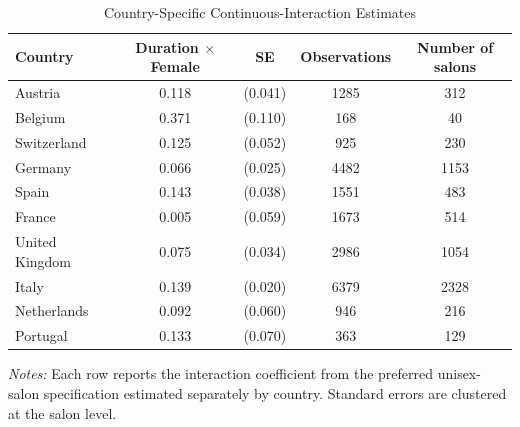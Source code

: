\documentclass[12pt,a4paper]{article}
\begin{document}
\begin{table}[htbp]
  \centering
  \caption{Country-Specific Continuous-Interaction Estimates}
  \label{tab:country_heterogeneity}
  \small

\begin{tabular}{lcccc}
\hline
Country & Duration $\times$ Female & SE & Observations & Number of salons \\
\hline
Austria & 0.118 & (0.041) & 1285 & 312 \\
Belgium & 0.371 & (0.110) & 168 & 40 \\
Switzerland & 0.125 & (0.052) & 925 & 230 \\
Germany & 0.066 & (0.025) & 4482 & 1153 \\
Spain & 0.143 & (0.038) & 1551 & 483 \\
France & 0.005 & (0.059) & 1673 & 514 \\
United Kingdom & 0.075 & (0.034) & 2986 & 1054 \\
Italy & 0.139 & (0.020) & 6379 & 2328 \\
Netherlands & 0.092 & (0.060) & 946 & 216 \\
Portugal & 0.133 & (0.070) & 363 & 129 \\
\hline
\end{tabular}

\begin{minipage}{0.88\linewidth}
    \footnotesize
    \textit{Notes:} Each row reports the interaction coefficient from the preferred unisex-salon specification estimated separately by country.
    Standard errors are clustered at the salon level.
\end{minipage}
\end{table}
\end{document}
